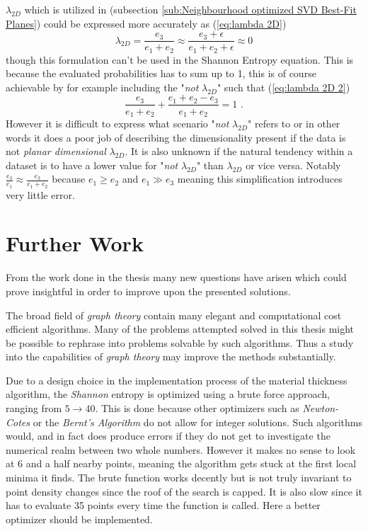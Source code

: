 \documentclass[%
]{USN-MSc}
\begin{document}
\(\lambda_{2D}\) which is utilized in (subsection \ref{sub:Neighbourhood optimized SVD Best-Fit Planes}) could be expressed more accurately as (\ref{eq:lambda 2D})
\begin{equation}
\label{eq:lambda 2D}
    \lambda_{2D} = \frac{e_3}{e_1 + e_2} \approx \frac{e_3+ \epsilon}{e_1 +e_2 + \epsilon} \approx 0
\end{equation} though this formulation can't be used in the Shannon Entropy equation. This is because the evaluated probabilities has to sum up to 1, this is of course achievable by for example including the "\textit{not} \(\lambda_{2D}\)" such that (\ref{eq:lambda 2D 2}) 
\begin{equation}
\label{eq:lambda 2D 2}
    \frac{e_3}{e_1 + e_2} + \frac{e_1 + e_2 -e_3}{e_1 + e_2} = 1 \text{ .}
\end{equation}
However it is difficult to express what scenario "\textit{not} \(\lambda_{2D}\)" refers to or in other words it does a poor job of describing the dimensionality present if the data is not \textit{planar dimensional} \(\lambda_{2D}\). It is also unknown if the natural tendency within a dataset is to have a lower value for "\textit{not} \(\lambda_{2D}\)" than \(\lambda_{2D}\) or vice versa. Notably \(\frac{e_3}{e_1} \approx \frac{e_3}{e_1 + e_2}\) because \(e_1 \geq e_2\) and \(e_1 \gg e_3\) meaning this simplification introduces very little error.

\section{Further Work}
\label{sec:Further Work}
From the work done in the thesis many new questions have arisen which could prove insightful in order to improve upon the presented solutions.

The broad field of \textit{graph theory} contain many elegant and computational cost efficient algorithms. Many of the problems attempted solved in this thesis might be possible to rephrase into problems solvable by such algorithms. Thus a study into the capabilities of \textit{graph theory} may improve the methods substantially.

Due to a design choice in the implementation process of the material thickness algorithm, the \textit{Shannon} entropy is optimized using a brute force approach, ranging from \(5 \to 40\). This is done because other optimizers such as \textit{Newton-Cotes} or the \textit{Bernt's Algorithm} do not allow for integer solutions. Such algorithms would, and in fact does produce errors if they do not get to investigate the numerical realm between two whole numbers. However it makes no sense to look at 6 and a half nearby points, meaning the algorithm gets stuck at the first local minima it finds. The brute function works decently but is not truly invariant to point density changes since the roof of the search is capped. It is also slow since it has to evaluate 35 points every time the function is called. Here a better optimizer should be implemented.
\end{document}
